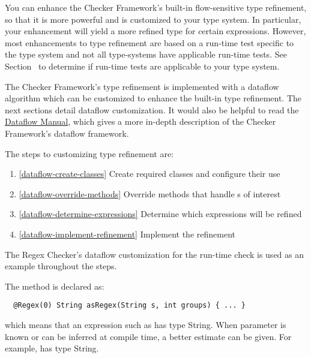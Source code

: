 You can enhance the Checker Framework's built-in flow-sensitive type refinement,
so that it is more powerful and is customized to your type system. In
particular, your enhancement will yield a more refined type for certain
expressions. However, most enhancements to type refinement are based on a
run-time test specific to the type system and not all type-systems have
applicable run-time tests.  See
Section~ to determine if
run-time tests are applicable to your type system.

The Checker Framework's type refinement is implemented with a dataflow algorithm
which can be customized to enhance the built-in type refinement. The next
sections detail dataflow customization.  It would also be helpful to read the
\href{http://types.cs.washington.edu/checker-framework/current/checker-framework-dataflow-manual.pdf}
{Dataflow Manual}, which gives a more in-depth description of the Checker
Framework's dataflow framework.

The steps to customizing type refinement are:
\begin{enumerate}
\item{\ref{dataflow-create-classes}} Create required classes and configure their
    use
\item{\ref{dataflow-override-methods}} Override methods that handle
    s of interest
\item{\ref{dataflow-determine-expressions}} Determine which expressions will be
    refined
\item{\ref{dataflow-implement-refinement}} Implement the refinement
\end{enumerate}

The Regex Checker's dataflow customization for the 
run-time check is used as an example throughout the steps.

The  method is declared as:

\begin{smaller}
\begin{Verbatim}
  @Regex(0) String asRegex(String s, int groups) { ... }
\end{Verbatim}
\end{smaller}

\noindent
which means that an expression such as 
has type  String. When  parameter  is
known or can be inferred at compile time, a better estimate can be given.  For
example,  has type  String.

